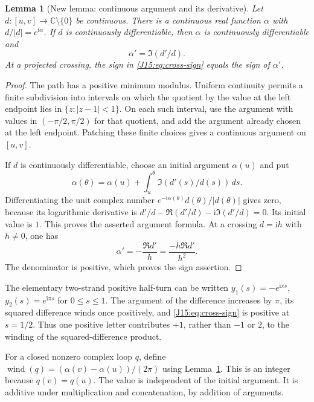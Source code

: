 \documentclass[11pt,oneside]{report}
\newtheorem{lemma}[theorem]{Lemma}
\theoremstyle{definition}
\numberwithin{equation}{section}
\newcommand{\C}{\mathbb C}
\newcommand{\wind}{\operatorname{wind}}
\newcommand{\ii}{\mathrm i}
\begin{document}
\begin{lemma}[New lemma: continuous argument and its derivative]
\label{J15:lem:argument}
Let $d:[u,v]\longrightarrow\C\setminus\{0\}$ be continuous.
There is a continuous real function $\alpha$ with
$d/|d|=e^{\ii\alpha}$. If $d$ is continuously differentiable, then
$\alpha$ is continuously differentiable and
\begin{equation}\label{J15:eq:argument-derivative}
 \alpha'=\Im(d'/d).
\end{equation}
At a projected crossing, the sign in \eqref{J15:eq:cross-sign} equals the sign
of $\alpha'$.
\end{lemma}

\begin{proof}
The path has a positive minimum modulus. Uniform continuity permits a
finite subdivision into intervals on which the quotient by the value at
the left endpoint lies in $\{z:|z-1|<1\}$. On each such interval,
use the argument with values in $(-\pi/2,\pi/2)$ for that quotient,
and add the argument already chosen at the left endpoint. Patching these
finite choices gives a continuous argument on $[u,v]$.

If $d$ is continuously differentiable, choose an initial argument
$\alpha(u)$ and put
\[
 \alpha(\theta)=\alpha(u)+\int_u^\theta\Im(d'(s)/d(s))\,ds.
\]
Differentiating the unit complex number
$e^{-\ii\alpha(\theta)}d(\theta)/|d(\theta)|$ gives zero, because
its logarithmic derivative is
$d'/d-\Re(d'/d)-\ii\Im(d'/d)=0$.
Its initial value is $1$. This proves the asserted argument formula.
At a crossing $d=\ii h$ with $h\ne0$, one has
\[
 \alpha'=-\frac{\Re d'}h
 =\frac{-h\Re d'}{h^2}.
\]
The denominator is positive, which proves the sign assertion.
\end{proof}

The elementary two-strand positive half-turn can be written
$y_1(s)=-e^{\ii\pi s}$, $y_2(s)=e^{\ii\pi s}$ for $0\le s\le1$.
The argument of the difference increases by $\pi$, its squared difference
winds once positively, and \eqref{J15:eq:cross-sign} is positive at $s=1/2$.
Thus one positive letter contributes $+1$, rather than $-1$ or $2$, to
the winding of the squared-difference product.

For a closed nonzero complex loop $q$, define
$\wind(q)=(\alpha(v)-\alpha(u))/(2\pi)$ using Lemma~\ref{J15:lem:argument}.
This is an integer because $q(v)=q(u)$. The value is independent of the
initial argument. It is additive under multiplication and concatenation,
by addition of arguments.
\end{document}
